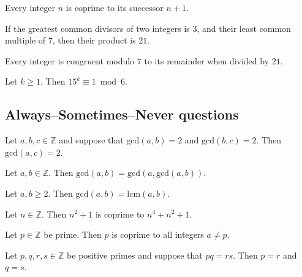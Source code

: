 \begin{chapex} %
Every integer $n$ is coprime to its successor $n+1$.
\end{chapex}

\begin{chapex} %
If the greatest common divisors of two integers is $3$, and their least common multiple of $7$, then their product is $21$.
\end{chapex}

\begin{chapex} %
Every integer is congruent modulo $7$ to its remainder when divided by $21$.
\end{chapex}

\begin{chapex} %
\label{cqNumberTheoryTFEnd}
Let $k \ge 1$. Then $15^k \equiv 1 \bmod 6$.
\end{chapex}

\subsection*{Always--Sometimes--Never questions}


\begin{chapex} %
\label{cqNumberTheoryASNBegin}
Let $a,b,c \in \mathbb{Z}$ and suppose that $\mathrm{gcd}(a,b) = 2$ and $\mathrm{gcd}(b,c) = 2$. Then $\mathrm{gcd}(a,c) = 2$.
\end{chapex}

\begin{chapex} %
Let $a,b \in \mathbb{Z}$. Then $\mathrm{gcd}(a,b) = \mathrm{gcd}(a,\mathrm{gcd}(a,b))$.
\end{chapex}

\begin{chapex} %
Let $a,b \ge 2$. Then $\mathrm{gcd}(a,b) = \mathrm{lcm}(a,b)$.
\end{chapex}

\begin{chapex} %
Let $n \in \mathbb{Z}$. Then $n^2+1$ is coprime to $n^4+n^2+1$.
\end{chapex}

\begin{chapex} %
Let $p \in \mathbb{Z}$ be prime. Then $p$ is coprime to all integers $a \ne p$.
\end{chapex}

\begin{chapex} %
Let $p,q,r,s \in \mathbb{Z}$ be positive primes and suppose that $pq=rs$. Then $p=r$ and $q=s$.
\end{chapex}

